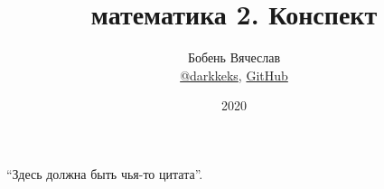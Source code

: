 \documentclass[a4paper]{article}
\title{\HugeДискретная математика 2. Конспект}
\author{
    Бобень Вячеслав \\
    \href{https://t.me/darkkeks}{@darkkeks},
    \href{https://github.com/hse-tex/hse-tex}{GitHub}
}
\date{2020}
\begin{document}
    \maketitle

    \epigraph{
        ``Здесь должна быть чья-то цитата''.
    }{}

    \tableofcontents

    \newpage

    
\end{document}
